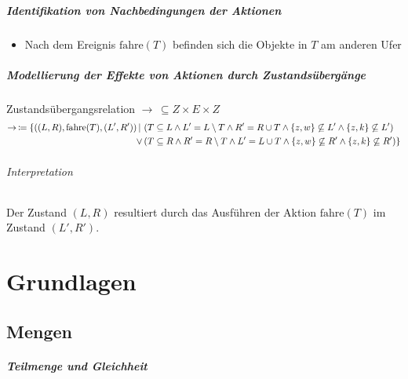 		    \paragraph{\textit{Identifikation} von Nachbedingungen der Aktionen}
			    \begin{itemize}
			    	\item Nach dem Ereignis $ \text{fahre}(T) $ befinden sich die Objekte in $ T $ am anderen Ufer
			    \end{itemize}
		    
		    \paragraph{\textit{Modellierung} der Effekte von Aktionen durch Zustandsübergänge}
			    Zustandsübergangsrelation $ \rightarrow\, \subseteq Z \times E \times Z $
			    \begin{align*}
				    \rightarrow\, \coloneqq \{ ((L, R), \text{fahre}(T), (L', R'))\,\vert\, &\, (T \subseteq L \land L' = L \setminus T \land R' = R \cup T \land \{ z, w \} \not\subseteq L' \land \{ z, k \} \not\subseteq L') \\
					    \lor &\, (T \subseteq R \land R' = R \setminus T \land L' = L \cup T \land \{ z, w \} \not\subseteq R' \land \{ z, k \} \not\subseteq R') \}
			    \end{align*}
			    
			    \subparagraph{Interpretation}
			    Der Zustand $ (L, R) $ resultiert durch das Ausführen der Aktion $ \text{fahre}(T) $ im Zustand $ (L', R') $.
			    

\chapter{Grundlagen}

	\section{Mengen}
	    \paragraph{Teilmenge und Gleichheit}
			
